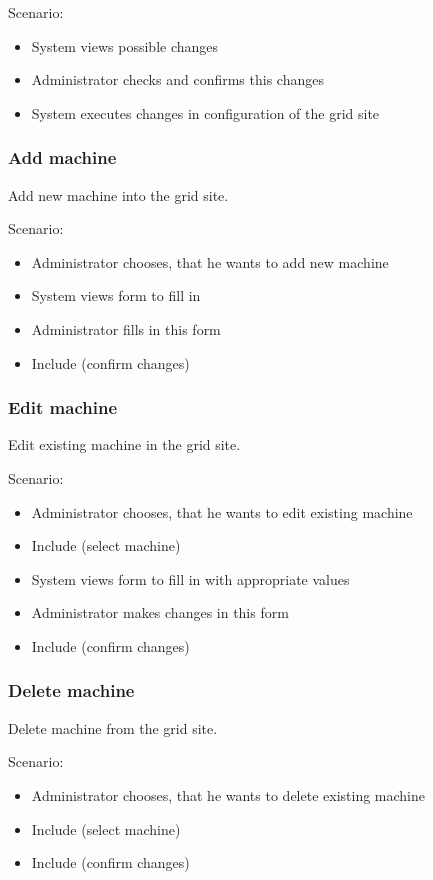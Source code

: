 \documentclass{article}
\begin{document}
Scenario:
\begin{itemize}
\item{System views possible changes}
\item{Administrator checks and confirms this changes}
\item{System executes changes in configuration of the grid site}
\end{itemize}

\subsubsection{Add machine}
Add new machine into the grid site.

Scenario:
\begin{itemize}
\item{Administrator chooses, that he wants to add new machine}
\item{System views form to fill in}
\item{Administrator fills in this form}
\item{Include (confirm changes)}
\end{itemize}

\subsubsection{Edit machine}
Edit existing machine in the grid site.

Scenario:
\begin{itemize}
\item{Administrator chooses, that he wants to edit existing machine}
\item{Include (select machine)}
\item{System views form to fill in with appropriate values}
\item{Administrator makes changes in this form}
\item{Include (confirm changes)}
\end{itemize}

\subsubsection{Delete machine}
Delete machine from the grid site.

Scenario:
\begin{itemize}
\item{Administrator chooses, that he wants to delete existing machine}
\item{Include (select machine)}
\item{Include (confirm changes)}
\end{itemize}
\end{document}
